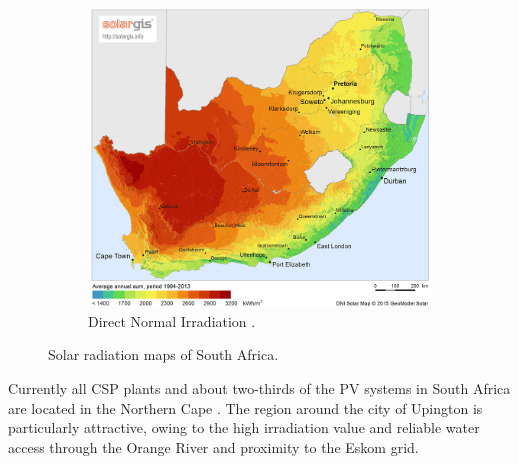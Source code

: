 \begin{figure}[h!]
\begin{subfigure}[b]{0.5\textwidth}
                \includegraphics[width=1\textwidth]{FIG/SA_DNI}
                \caption{Direct Normal Irradiation \cite{SolarGIS2015b}.}\label{fig:bild-rechts}
        \end{subfigure}
        \caption{Solar radiation maps of South Africa.}\label{irradiation}
\end{figure}
\pagebreak

Currently all \ac{CSP} plants and about two-thirds of the \ac{PV} systems in South Africa are located in the Northern Cape \cite{Forder2015}. The region around the city of Upington is particularly attractive, owing to the high irradiation value and reliable water access through the Orange River and proximity to the Eskom grid.


